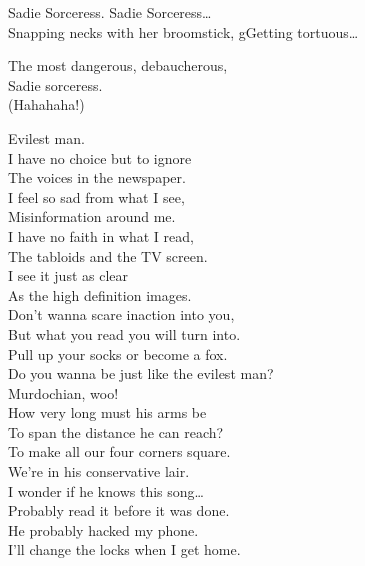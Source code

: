 
Sadie Sorceress. Sadie Sorceress… \\
Snapping necks with her broomstick, gGetting tortuous… \\


The most dangerous, debaucherous, \\
Sadie sorceress. \\
(Hahahaha!) \\





Evilest man. \\

I have no choice but to ignore \\
The voices in the newspaper. \\
I feel so sad from what I see, \\
Misinformation around me. \\

I have no faith in what I read, \\
The tabloids and the TV screen. \\
I see it just as clear \\
As the high definition images. \\

Don't wanna scare inaction into you, \\
But what you read you will turn into. \\
Pull up your socks or become a fox. \\
Do you wanna be just like the evilest man? \\
Murdochian, woo! \\

How very long must his arms be \\
To span the distance he can reach? \\
To make all our four corners square. \\
We're in his conservative lair. \\

I wonder if he knows this song… \\
Probably read it before it was done. \\
He probably hacked my phone. \\
I'll change the locks when I get home. \\

